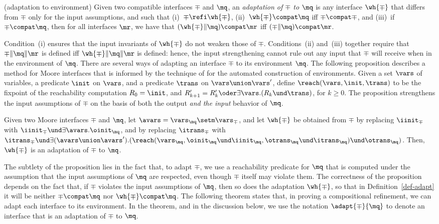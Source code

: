 \begin{defi}{(adaptation to environment)}
\label{def-adapt} 
Given two compatible interfaces $\mp$ and $\mq$, an 
{\em adaptation of $\mp$ to $\mq$\/} is any interface 
$\wh{\mp}$ that differs from $\mp$ only for the input assumptions, and
such that
(i)~$\mp \refi \wh{\mp}$, 
(ii)~$\wh{\mp} \compat \mq$ iff $\mp \compat \mp$, 
and (iii)~if $\mp \compat \mq$, then for all interfaces $\mr$,  
we have that 
$(\wh{\mp} \| \mq) \compat\mr$ iff $(\mp\|\mq)\compat\mr$.
\end{defi}

\noindent
Condition~(i) ensures that the input invariants of $\wh{\mp}$
do not weaken those of $\mp$.
Conditions~(ii) and~(iii) together require that $\mp\|\mq\|\mr$ is
defined iff $\wh{\mp}\|\mq\|\mr$ is defined: hence, the input
strengthening cannot rule out any input that $\mp$ will receive when
in the environment of $\mq$. 
There are several ways of adapting an interface $\mp$ to its
environment $\mq$. 
The following proposition describes a method for Moore interfaces that
is informed by the technique of \cite{concur99freddy} for the
automated construction of environments.
Given a set $\vars$ of variables, a predicate $\init$ on $\vars$, 
and a predicate $\trans$ on $\vars \union \vars'$, 
define $\reach(\vars,\init,\trans)$ to be the fixpoint of the
reachability computation $R_0 = \init$, and 
$R'_{k+1} = R'_k \oder \exists \vars . (R_k \und \trans)$, for $k \geq 0$.
The proposition strengthens the input assumptions of $\mp$ on the
basis of both the output {\em and the input\/} behavior of $\mq$. 

\begin{prop}{} 
\label{prop-adapt} 
Given two Moore interfaces $\mp$ and $\mq$, 
let $\avars = \vars_\mq \setm \vars_\mp$,
and let $\wh{\mp}$ be obtained
from $\mp$ by replacing $\iinit_\mp$ with 
$\iinit_\mp \und \exists \avars . \oinit_\mq$, 
and by replacing $\itrans_\mp$ with 
$\itrans_\mp \und \exists (\avars \union \avars') . 
(\reach(\vars_\mq,\oinit_\mq \und \iinit_\mq,\otrans_\mq \und
\itrans_\mq) \und \otrans_\mq)$.
Then, $\wh{\mp}$ is an adaptation of $\mp$ to $\mq$. 
\end{prop}

\noindent
The subtlety of the proposition lies in the fact that, to adapt 
$\mp$, we use a reachability predicate for $\mq$ that is computed
under the assumption that the input assumptions of $\mq$ are
respected, even though $\mp$ itself may violate them. 
The correctness of the proposition depends on the fact that, if $\mp$
violates the input assumptions of $\mq$, then so does the adaptation
$\wh{\mp}$, so that in Definition~\ref{def-adapt} it will be neither
$\mp \compat \mq$ nor $\wh{\mp} \compat \mq$. 
The following theorem states that, in proving a compositional
refinement, we can adapt each interface to its environment.
In the theorem, and in the discussion below, we use the notation 
$\adapt{\mp}{\mq}$ to denote an interface that is an adaptation of
$\mp$ to $\mq$. 

